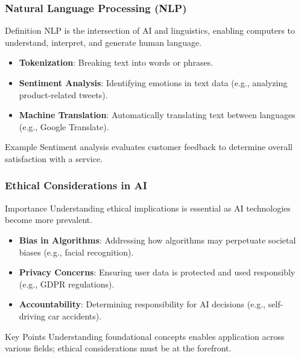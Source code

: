 \documentclass{beamer}
\begin{document}
\begin{frame}[fragile]
    \frametitle{Natural Language Processing (NLP)}
    \begin{block}{Definition}
        NLP is the intersection of AI and linguistics, enabling computers to understand, interpret, and generate human language.
    \end{block}
    
    \begin{itemize}
        \item \textbf{Tokenization}: Breaking text into words or phrases.
        \item \textbf{Sentiment Analysis}: Identifying emotions in text data (e.g., analyzing product-related tweets).
        \item \textbf{Machine Translation}: Automatically translating text between languages (e.g., Google Translate).
    \end{itemize}
    
    \begin{block}{Example}
        Sentiment analysis evaluates customer feedback to determine overall satisfaction with a service.
    \end{block}
\end{frame}

\begin{frame}[fragile]
    \frametitle{Ethical Considerations in AI}
    \begin{block}{Importance}
        Understanding ethical implications is essential as AI technologies become more prevalent.
    \end{block}
    
    \begin{itemize}
        \item \textbf{Bias in Algorithms}: Addressing how algorithms may perpetuate societal biases (e.g., facial recognition).
        \item \textbf{Privacy Concerns}: Ensuring user data is protected and used responsibly (e.g., GDPR regulations).
        \item \textbf{Accountability}: Determining responsibility for AI decisions (e.g., self-driving car accidents).
    \end{itemize}
    
    \begin{block}{Key Points}
        Understanding foundational concepts enables application across various fields; ethical considerations must be at the forefront.
    \end{block}
\end{frame}
\end{document}

